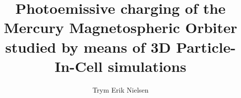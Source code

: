 \documentclass[a4paper, american]{memoir}
\title{Photoemissive charging of the Mercury Magnetospheric Orbiter studied by means of 3D Particle-In-Cell simulations}
\author{Trym Erik Nielsen}
\begin{document}
    \frontmatter        %

    \masterfrontpage
    
    
    

    \cleartorecto
    \tableofcontents    %
    \cleartorecto
    \listoffigures      %
    \cleartorecto
    \listoftables       %

    \mainmatter         %

    
    
    
    
    
    

    \appendix           %
    \appendixpage       %

    
    
    
    

    \backmatter         %

    \printbibliography
\end{document}
